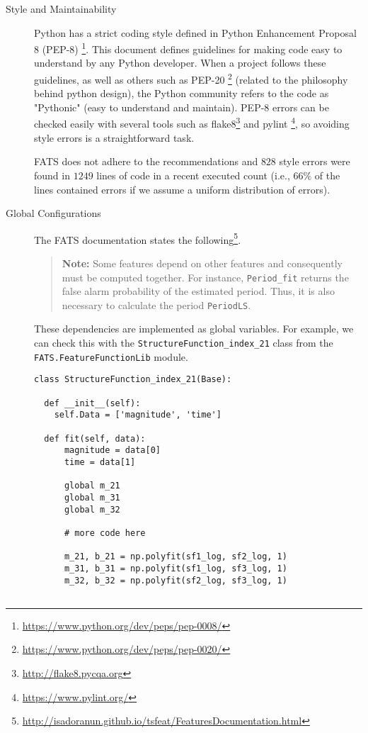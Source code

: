 \documentclass[final,5p,times,twocolumn,authoryear]{elsarticle}
\begin{document}
\begin{description}
\item [Style and Maintainability] 
  Python has a strict coding style defined
  in Python Enhancement Proposal 8 (PEP-8) \footnote{\url{https://www.python.org/dev/peps/pep-0008/}}.
  This document defines guidelines for making code easy to understand by any
  Python developer. When a project follows these guidelines, as well as others such as
  PEP-20 \footnote{\url{https://www.python.org/dev/peps/pep-0020/}} 
  (related to the philosophy behind python design), the Python community refers to 
  the code as "Pythonic" (easy to understand and maintain). 
  PEP-8 errors can be checked easily with several tools such as 
  flake8\footnote{\url{http://flake8.pycqa.org}} 
  and pylint \footnote{\url{https://www.pylint.org/}}, so avoiding
  style errors is a straightforward task. 
  
  FATS does not adhere to the recommendations and $828$
  style errors were found in $1249$ lines of code in a recent executed count 
  (i.e., $66\%$ of the lines contained errors if we assume a
  uniform distribution of errors).

\item [Global Configurations]
  The FATS documentation states the following\footnote{\url{http://isadoranun.github.io/tsfeat/FeaturesDocumentation.html}}.
  \begin{quotation}
  \textbf{Note:} Some features depend on other features and consequently 
  must be computed together. For instance, \texttt{Period\_fit} returns the 
  false alarm probability of the estimated period. 
  Thus, it is also necessary to calculate the period \texttt{PeriodLS}.
  \end{quotation}

  These dependencies are implemented as global variables. 
  For example, we can check this with the 
  \texttt{StructureFunction\_index\_21} class from the 
  \texttt{FATS.FeatureFunctionLib} module.
  
\begin{verbatim}
class StructureFunction_index_21(Base):

  def __init__(self):
    self.Data = ['magnitude', 'time']
  
  def fit(self, data):
      magnitude = data[0]
      time = data[1]

      global m_21
      global m_31
      global m_32

      # more code here

      m_21, b_21 = np.polyfit(sf1_log, sf2_log, 1)
      m_31, b_31 = np.polyfit(sf1_log, sf3_log, 1)
      m_32, b_32 = np.polyfit(sf2_log, sf3_log, 1)


\end{verbatim}
\end{description}
\end{document}
